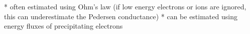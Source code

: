 

* often estimated using Ohm's law (if low energy electrons or ions are
ignored, this can underestimate the Pedersen conductance)
* can be estimated using energy fluxes of precipitating electrons
